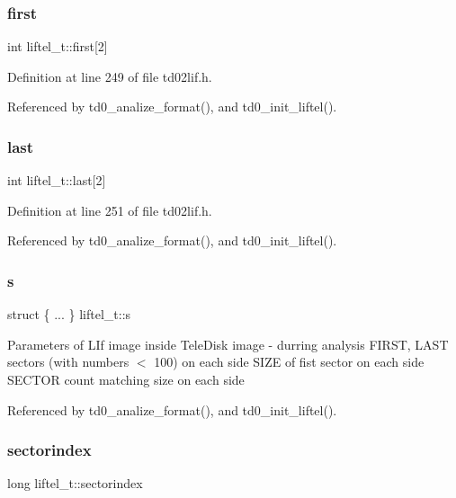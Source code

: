\subsubsection{\texorpdfstring{first}{first}}
{\footnotesize\ttfamily int liftel\+\_\+t\+::first\mbox{[}2\mbox{]}}



Definition at line 249 of file td02lif.\+h.



Referenced by td0\+\_\+analize\+\_\+format(), and td0\+\_\+init\+\_\+liftel().

\mbox{\label{structliftel__t_accda68319750f6ea7a63948fb0d7d223}} 
\subsubsection{\texorpdfstring{last}{last}}
{\footnotesize\ttfamily int liftel\+\_\+t\+::last\mbox{[}2\mbox{]}}



Definition at line 251 of file td02lif.\+h.



Referenced by td0\+\_\+analize\+\_\+format(), and td0\+\_\+init\+\_\+liftel().

\mbox{\label{structliftel__t_a2482ae8a5356a7381dfa96e2606e66f6}} 
\subsubsection{\texorpdfstring{s}{s}}
{\footnotesize\ttfamily struct \{ ... \}   liftel\+\_\+t\+::s}

Parameters of L\+If image inside Tele\+Disk image -\/ durring analysis F\+I\+R\+ST, L\+A\+ST sectors (with numbers $<$ 100) on each side S\+I\+ZE of fist sector on each side S\+E\+C\+T\+OR count matching size on each side 

Referenced by td0\+\_\+analize\+\_\+format(), and td0\+\_\+init\+\_\+liftel().

\mbox{\label{structliftel__t_a13e9f8b2e23d8f028f456d4465beb4d5}} 
\subsubsection{\texorpdfstring{sectorindex}{sectorindex}}
{\footnotesize\ttfamily long liftel\+\_\+t\+::sectorindex}



